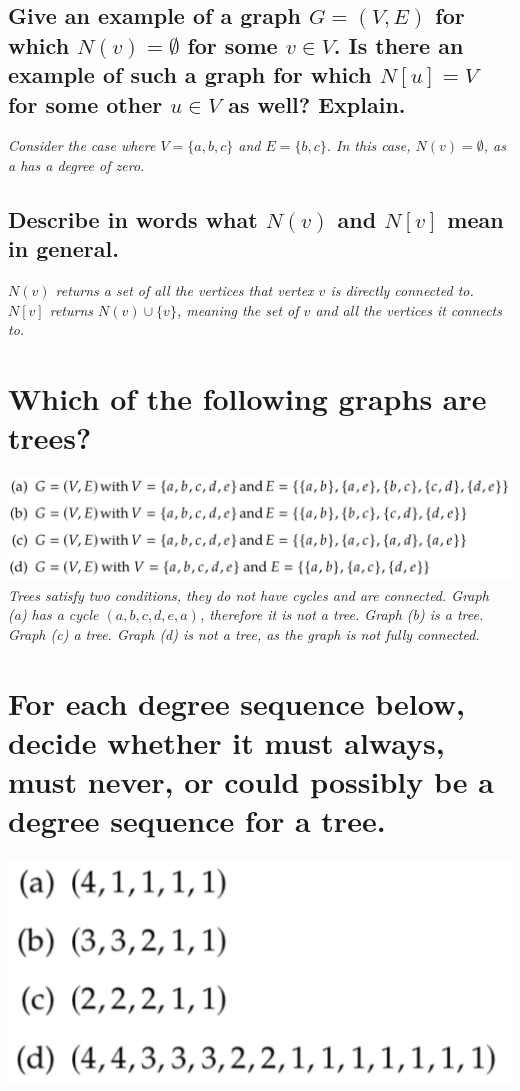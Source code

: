\documentclass{article}
\begin{document}
\subsection{Give an example of a graph $G=(V,E)$ for which $N(v) = \emptyset$ for some $v\in V$. Is there an example of such a graph for which $N[u]=V$ for some other $u\in V$ as well? Explain.}
\hspace{1cm}\textit{Consider the case where $V=\{a,b,c\}$ and $E=\{b,c\}$. In this case, $N(v)=\emptyset$, as a has a degree of zero.}
\subsection{Describe in words what $N(v)$ and $N[v]$ mean in general.}
\hspace{1cm}\textit{$N(v)$ returns a set of all the vertices that vertex $v$ is directly connected to. $N[v]$ returns $N(v)\cup\{v\}$, meaning the set of $v$ and all the vertices it connects to.}
\clearpage


\section{Which of the following graphs are trees?}
\includegraphics[scale=0.27]{problem2.png} \\

\textit{Trees satisfy two conditions, they do not have cycles and are connected. Graph (a) has a cycle $(a,b,c,d,e,a)$, therefore it is not a tree. Graph (b) is a tree. Graph (c) a tree. Graph (d) is not a tree, as the graph is not fully connected.}




\section{For each degree sequence below, decide whether it must always, must never, or could possibly be a degree sequence for a tree.}
\hspace{1cm}\includegraphics[scale=0.27]{problem3.png}
\end{document}

